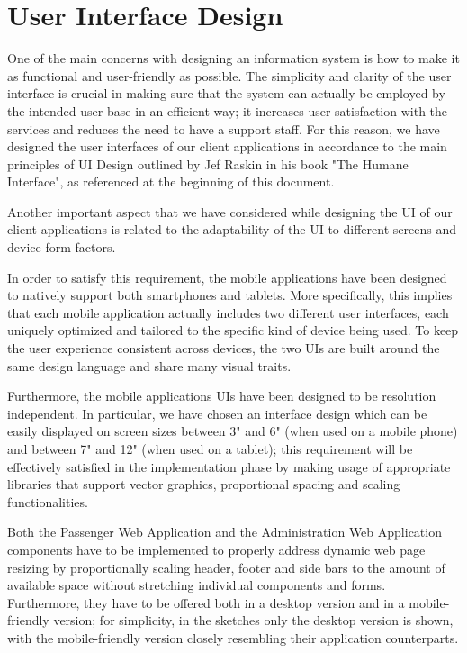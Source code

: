 \chapter{User Interface Design}
One of the main concerns with designing an information system is how to make it as functional and user-friendly as possible. The simplicity and clarity of the user interface is crucial in making sure that the system can actually be employed by the intended user base in an efficient way; it increases user satisfaction with the services and reduces the need to have a support staff. 
For this reason, we have designed the user interfaces of our client applications in accordance to the main principles of UI Design outlined by Jef Raskin in his book "The Humane Interface", as referenced at the beginning of this document. 

Another important aspect that we have considered while designing the UI of our client applications is related to the adaptability of the UI to different screens and device form factors. 

In order to satisfy this requirement, the mobile applications have been designed to natively support both smartphones and tablets. More specifically, this implies that each mobile application actually includes two different user interfaces, each uniquely optimized and tailored to the specific kind of device being used. To keep the user experience consistent across devices, the two UIs are built around the same design language and share many visual traits. 

Furthermore, the mobile applications UIs have been designed to be resolution independent. In particular, we have chosen an interface design which can be easily displayed on screen sizes between 3" and 6" (when used on a mobile phone) and between 7" and 12" (when used on a tablet); this requirement will be effectively satisfied in the implementation phase by making usage of appropriate libraries that support vector graphics, proportional spacing and scaling functionalities.

Both the Passenger Web Application and the Administration Web Application components have to be implemented to properly address dynamic web page resizing by proportionally scaling header, footer and side bars to the amount of available space without stretching individual components and forms. Furthermore, they have to be offered both in a desktop version and in a mobile-friendly version; for simplicity, in the sketches only the desktop version is shown, with the mobile-friendly version closely resembling their application counterparts. 

